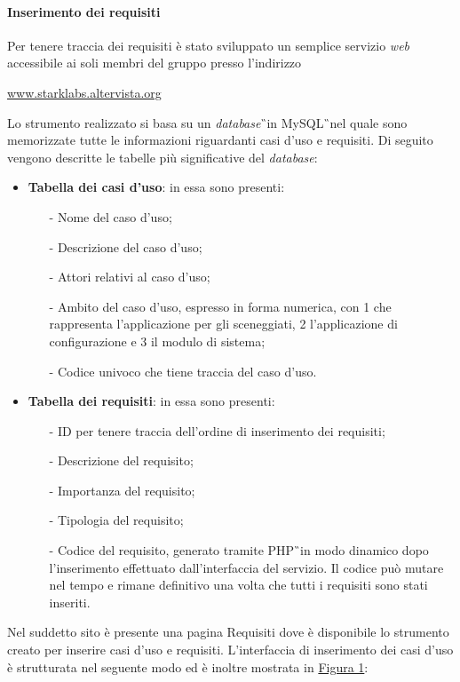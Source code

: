 \paragraph{Inserimento dei requisiti}
Per tenere traccia dei requisiti è stato sviluppato un semplice servizio \textit{web} accessibile ai soli membri del gruppo presso l'indirizzo
\begin{center}
	\url{www.starklabs.altervista.org} \\
\end{center}
Lo strumento realizzato si basa su un \textit{database}\G\ in MySQL\G\ nel quale sono memorizzate tutte le informazioni riguardanti casi d'uso e requisiti. Di seguito vengono descritte le tabelle più significative del \textit{database}:
\begin{itemize}
\item \textbf{Tabella dei casi d'uso}: in essa sono presenti:
	\begin{itemize}
		 \item [-] Nome del caso d'uso;
		 \item [-] Descrizione del caso d'uso;
		 \item [-] Attori relativi al caso d'uso; 
		 \item [-] Ambito del caso d'uso, espresso in forma numerica, con 1 che rappresenta l'applicazione per gli sceneggiati, 2 l'applicazione di configurazione e 3 il modulo di sistema; 
		 \item [-] Codice univoco che tiene traccia del caso d'uso.
	\end{itemize}
\item \textbf{Tabella dei requisiti}: in essa sono presenti: 
	\begin{itemize}
		\item [-] ID per tenere traccia dell'ordine di inserimento dei requisiti;
		\item [-] Descrizione del requisito;
		\item [-] Importanza del requisito;
		\item [-] Tipologia del requisito;
		\item [-] Codice del requisito, generato tramite PHP\G\ in modo dinamico dopo l'inserimento effettuato dall'interfaccia del servizio. Il codice può mutare nel tempo e rimane definitivo una volta che tutti i requisiti sono stati inseriti.
	\end{itemize}
\end{itemize}
Nel suddetto sito è presente una pagina Requisiti dove è disponibile lo strumento creato per inserire casi d'uso e requisiti. L'interfaccia di inserimento dei casi d'uso è strutturata nel seguente modo ed è inoltre mostrata in \hyperref[sec:Figura1]{Figura 1}:
